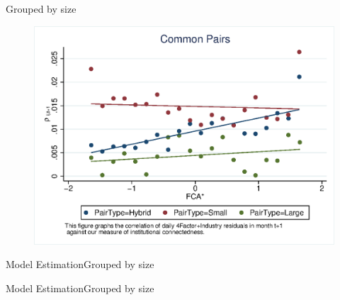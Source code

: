 \documentclass{beamer}
\begin{document}
	\begin{frame}{Grouped by size}
		\begin{figure}
			\centering  
			\includegraphics[width=0.9\linewidth]{"Output/mcorrPairType.eps"}
		\end{figure}
	\end{frame}	
	
	
\begin{frame}{Model Estimation}{Grouped by size}
	\label{Monthly14} 
	\begin{table}[htbp]
		\centering
		\resizebox{1\textwidth}{!}{
			
		}
	\end{table}
	
	
\end{frame}
	
\begin{frame}{Model Estimation}{Grouped by size}
	\label{Monthly14} 
	\begin{table}[htbp]
		\centering
		\resizebox{1\textwidth}{!}{
			
		}
	\end{table}
	
	
\end{frame}
	
	
	
	
	
\end{document}

